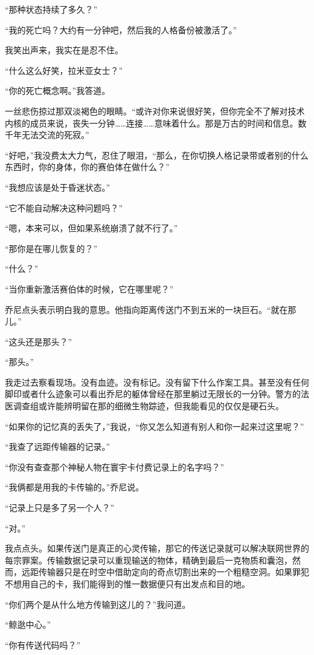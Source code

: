 \documentclass[AutoFakeBold=true]{book}
\begin{document}
``那种状态持续了多久？''

``我的死亡吗？大约有一分钟吧，然后我的人格备份被激活了。''

我笑出声来，我实在是忍不住。

``什么这么好笑，拉米亚女士？''

``你的死亡概念啊。''我答道。

一丝悲伤掠过那双淡褐色的眼睛。``或许对你来说很好笑，但你完全不了解对技术内核的成员来说，丧失一分钟……连接……意味着什么。那是万古的时间和信息。数千年无法交流的死寂。''

``好吧，''我没费太大力气，忍住了眼泪，``那么，在你切换人格记录带或者别的什么东西时，你的身体，你的赛伯体在做什么？''

``我想应该是处于昏迷状态。''

``它不能自动解决这种问题吗？''

``嗯，本来可以，但如果系统崩溃了就不行了。''

``那你是在哪儿恢复的？''

``什么？''

``当你重新激活赛伯体的时候，它在哪里呢？''

乔尼点头表示明白我的意思。他指向距离传送门不到五米的一块巨石。``就在那儿。''

``这头还是那头？''

``那头。''

我走过去察看现场。没有血迹。没有标记。没有留下什么作案工具。甚至没有任何脚印或者什么迹象可以看出乔尼的躯体曾经在那里躺过无限长的一分钟。警方的法医调查组或许能辨明留在那的细微生物踪迹，但我能看见的仅仅是硬石头。

``如果你的记忆真的丢失了，''我说，``你又怎么知道有别人和你一起来过这里呢？''

``我查了远距传输器的记录。''

``你没有查查那个神秘人物在寰宇卡付费记录上的名字吗？''

``我俩都是用我的卡传输的。''乔尼说。

``记录上只是多了另一个人？''

``对。''

我点点头。如果传送门是真正的心灵传输，那它的传送记录就可以解决联网世界的每宗罪案。传输数据记录可以重现输送的物体，精确到最后一克物质和囊泡，然而，远距传输器只是在时空中借助定向的奇点切割出来的一个粗糙空洞。如果罪犯不想用自己的卡，我们能得到的惟一数据便只有出发点和目的地。

``你们两个是从什么地方传输到这儿的？''我问道。

``鲸逖中心。''

``你有传送代码吗？''
\end{document}
